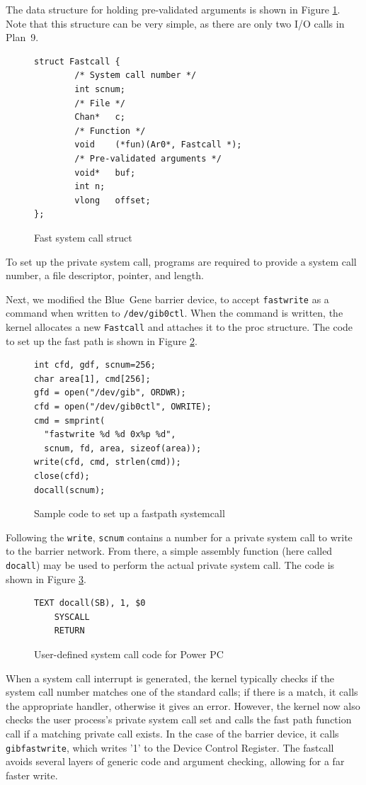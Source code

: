\documentclass[letterpaper,twocolumn,10pt]{article}
\begin{document}
The data structure for holding pre-validated arguments is shown in Figure \ref{scstruct}. Note that this structure can be very simple, as there are only two I/O calls in Plan~9. 

\begin{figure}
\begin{verbatim}
struct Fastcall {
        /* System call number */
        int	scnum;
        /* File */
        Chan*	c;
        /* Function */
        void	(*fun)(Ar0*, Fastcall *);
        /* Pre-validated arguments */
        void*	buf;
        int	n;
        vlong	offset;
};
\end{verbatim}
\caption{\label{scstruct}Fast system call struct}
\end{figure}

To set up the private system call, programs are required to provide a system call number, a file descriptor, pointer, and length.

Next, we modified the Blue~Gene barrier device, to accept {\tt fastwrite} as a command when written to {\tt /dev/gib0ctl}. When the command is written, the kernel allocates a new {\tt Fastcall} and attaches it to the proc structure. The code to set up the fast path is shown in Figure \ref{code}.
\begin{figure}
\begin{verbatim}
int cfd, gdf, scnum=256;
char area[1], cmd[256];
gfd = open("/dev/gib", ORDWR);
cfd = open("/dev/gib0ctl", OWRITE);
cmd = smprint(
  "fastwrite %d %d 0x%p %d", 
  scnum, fd, area, sizeof(area));
write(cfd, cmd, strlen(cmd));
close(cfd);
docall(scnum);
\end{verbatim}
\caption{\label{code}Sample code to set up a fastpath systemcall}
\end{figure}

Following the {\tt write}, {\tt scnum} contains a number for a private system call to write to the barrier network. From there, a simple assembly function (here called {\tt docall}) may be used to perform the actual private system call. The code is shown in Figure \ref{docall}. 

\begin{figure}
\begin{verbatim}
TEXT docall(SB), 1, $0
    SYSCALL
    RETURN
\end{verbatim}
\caption{\label{docall}User-defined system call code for Power PC}
\end{figure}

When a system call interrupt is generated, the kernel typically checks if the system call number matches one of the standard calls; if there is a match, it calls the appropriate handler, otherwise it gives an error. However, the kernel now also checks the user process's private system call set and calls the fast path function call if a matching private call exists. In the case of the barrier device, it calls {\tt gibfastwrite}, which writes '1' to the Device Control Register. The fastcall avoids several layers of generic code and argument checking, allowing for a far faster write.
\end{document}
